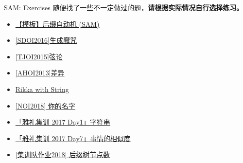 \documentclass{beamer}
\theoremstyle{compact}
\begin{document}
\begin{frame}{SAM: Exercises}
	随便找了一些不一定做过的题，\textbf{请根据实际情况自行选择练习。}

	\begin{itemize}
		\item \href{https://www.luogu.com.cn/problem/P3804}{【模板】后缀自动机 (SAM)}
		\item \href{https://www.luogu.com.cn/problem/P4070}{[SDOI2016]生成魔咒}
		\item \href{https://www.luogu.com.cn/problem/P3975}{[TJOI2015]弦论}
		\item \href{https://www.luogu.com.cn/problem/P4248}{[AHOI2013]差异}
		\item \href{https://vjudge.net/problem/HihoCoder-1413}{Rikka with String}
		\item \href{https://www.luogu.com.cn/problem/P4770}{[NOI2018] 你的名字}
		\item \href{https://loj.ac/p/6031}{「雅礼集训 2017 Day1」字符串}
		\item \href{https://loj.ac/p/6041}{「雅礼集训 2017 Day7」事情的相似度}
		\item \href{https://www.luogu.com.cn/problem/P6152}{[集训队作业2018] 后缀树节点数}
	\end{itemize}
\end{frame}
\end{document}
